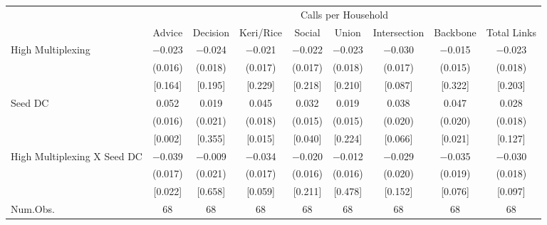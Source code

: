 \begin{table}
\centering
\begin{tabular}[t]{lcccccccc}
\toprule
\multicolumn{1}{c}{ } & \multicolumn{8}{c}{Calls per Household} \\
\cmidrule(l{3pt}r{3pt}){2-9}
  & Advice & Decision & Keri/Rice & Social & Union & Intersection & Backbone & Total Links\\
\midrule
High Multiplexing & \num{-0.023} & \num{-0.024} & \num{-0.021} & \num{-0.022} & \num{-0.023} & \num{-0.030} & \num{-0.015} & \num{-0.023}\\
 & (\num{0.016}) & (\num{0.018}) & (\num{0.017}) & (\num{0.017}) & (\num{0.018}) & (\num{0.017}) & (\num{0.015}) & (\num{0.018})\\
 & {}[\num{0.164}] & {}[\num{0.195}] & {}[\num{0.229}] & {}[\num{0.218}] & {}[\num{0.210}] & {}[\num{0.087}] & {}[\num{0.322}] & {}[\num{0.203}]\\
Seed DC & \num{0.052} & \num{0.019} & \num{0.045} & \num{0.032} & \num{0.019} & \num{0.038} & \num{0.047} & \num{0.028}\\
 & (\num{0.016}) & (\num{0.021}) & (\num{0.018}) & (\num{0.015}) & (\num{0.015}) & (\num{0.020}) & (\num{0.020}) & (\num{0.018})\\
 & {}[\num{0.002}] & {}[\num{0.355}] & {}[\num{0.015}] & {}[\num{0.040}] & {}[\num{0.224}] & {}[\num{0.066}] & {}[\num{0.021}] & {}[\num{0.127}]\\
High Multiplexing X Seed DC & \num{-0.039} & \num{-0.009} & \num{-0.034} & \num{-0.020} & \num{-0.012} & \num{-0.029} & \num{-0.035} & \num{-0.030}\\
 & (\num{0.017}) & (\num{0.021}) & (\num{0.017}) & (\num{0.016}) & (\num{0.016}) & (\num{0.020}) & (\num{0.019}) & (\num{0.018})\\
 & {}[\num{0.022}] & {}[\num{0.658}] & {}[\num{0.059}] & {}[\num{0.211}] & {}[\num{0.478}] & {}[\num{0.152}] & {}[\num{0.076}] & {}[\num{0.097}]\\
\midrule
Num.Obs. & \num{68} & \num{68} & \num{68} & \num{68} & \num{68} & \num{68} & \num{68} & \num{68}\\
\bottomrule
\end{tabular}
\end{table}
